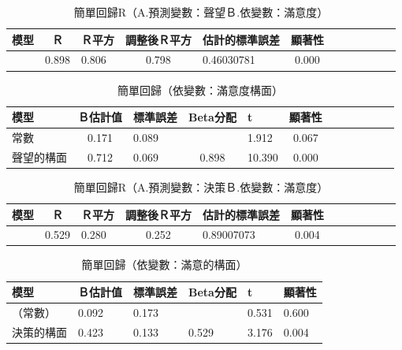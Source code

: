 \begin{table}[H]
\caption{簡單回歸R（A.預測變數：聲望Ｂ.依變數：滿意度）}
\label{tab:HR6}
\centering
\renewcommand{\arraystretch}{1.2} %
\arrayrulewidth=1pt               %
\tabcolsep=10pt                   %
\begin{tabular}[t]{lclclclclclc|}  %
\hline
 模型&Ｒ&Ｒ平方&調整後Ｒ平方&估計的標準誤差&顯著性\\
\hline
&0.898&0.806&0.798&0.46030781&0.000\\
\hline
\end{tabular}
\end{table}

\begin{table}[H]
\caption{簡單回歸（依變數：滿意度構面）}
\label{tab:H6}
\centering
\renewcommand{\arraystretch}{1.2} %
\arrayrulewidth=1pt               %
\tabcolsep=10pt                   %
\begin{tabular}[t]{lclclclclclc|}  %
\hline
 模型&Ｂ估計值&標準誤差&Beta分配&t&顯著性\\
\hline
常數&0.171&0.089&&1.912&0.067 \\
聲望的構面 & 0.712 & 0.069 & 0.898 & 10.390 & 0.000 \\
\hline
\end{tabular}
\end{table}


\begin{table}[H]
\caption{簡單回歸R（A.預測變數：決策Ｂ.依變數：滿意度）}
\label{tab:HR7}
\centering
\renewcommand{\arraystretch}{1.2} %
\arrayrulewidth=1pt               %
\tabcolsep=10pt                   %
\begin{tabular}[t]{lclclclclclc|}  %
\hline
 模型&Ｒ&Ｒ平方&調整後Ｒ平方&估計的標準誤差&顯著性\\
\hline
&0.529&0.280&0.252&0.89007073&0.004\\
\hline
\end{tabular}
\end{table}

\begin{table}[H]
\caption{簡單回歸（依變數：滿意的構面）}
\label{tab:H7}
\centering
\renewcommand{\arraystretch}{1.2} %
\arrayrulewidth=1pt               %
\tabcolsep=10pt                   %
\begin{tabular}[t]{llllll}  %
\hline
 模型&Ｂ估計值&標準誤差&Beta分配&t&顯著性\\
\hline
（常數）&0.092&0.173& &0.531&0.600\\
決策的構面&0.423&0.133&0.529&3.176&0.004\\
\hline
\end{tabular}
\end{table}



